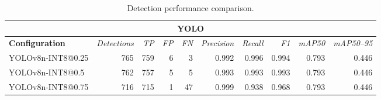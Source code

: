 \begin{table}[t]
\centering
\small
\setlength{\tabcolsep}{5pt}
\renewcommand{\arraystretch}{1.08}
\begin{tabular}{lrrrrrrrrr}
\hline
\multicolumn{10}{c}{\textbf{YOLO}} \\
\hline
\textbf{Configuration} & \textit{Detections} & \textit{TP} & \textit{FP} & \textit{FN} & \textit{Precision} & \textit{Recall} & \textit{F1} & \textit{mAP50} & \textit{mAP50--95} \\
\hline
YOLOv8n-INT8@0.25 & 765 & 759 & 6 & 3 & 0.992 & 0.996 & 0.994 & 0.793 & 0.446 \\
YOLOv8n-INT8@0.5 & 762 & 757 & 5 & 5 & 0.993 & 0.993 & 0.993 & 0.793 & 0.446 \\
YOLOv8n-INT8@0.75 & 716 & 715 & 1 & 47 & 0.999 & 0.938 & 0.968 & 0.793 & 0.446 \\
\hline
\end{tabular}
\caption{Detection performance comparison.}
\label{tab:detection-results}
\end{table}
